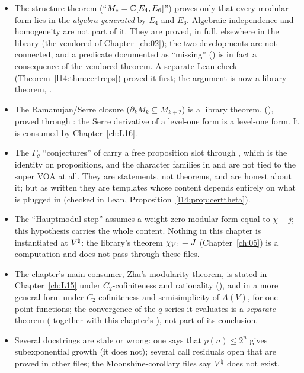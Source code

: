 \begin{itemize}
\item The structure theorem  (``$M_* = {\mathbb{C}}[E_4,E_6]$'') proves only that every modular form lies
  in the \emph{algebra generated} by $E_4$ and $E_6$. Algebraic independence and homogeneity are not part of it. They are
  proved, in full, elsewhere in the library (the vendored  of
  Chapter~\ref{ch:02}); the two developments are not connected, and a predicate documented as ``missing''
  () is in fact a consequence of the vendored theorem. A separate Lean check
  (Theorem~\ref{l14:thm:certreps}) proved it first; the argument is now a library theorem,
  .
\item The Ramanujan/Serre closure  ($\partial_k M_k\subseteq M_{k+2}$) is a library theorem,
   (), proved through
  : the Serre derivative of a level-one form is a level-one form. It is consumed by Chapter~\ref{ch:L16}.
\item The $\Gamma_\theta$ ``conjectures'' of  carry a free proposition slot
   through , which is the identity on propositions, and the character families in
   and  are not tied to the super VOA at all. They are statements, not
  theorems, and are honest about it; but as written they are templates whose content depends entirely on what is plugged in
  (checked in Lean, Proposition~\ref{l14:prop:certtheta}).
\item The ``Hauptmodul step''  assumes a weight-zero modular form equal to $\chi - j$;
  this hypothesis carries the whole content. Nothing in this chapter is instantiated at ${V^{\natural}}$: the library's theorem
  $\chi_{{V^{\natural}}} = J$ (Chapter~\ref{ch:05}) is a computation and does not pass through these files.
\item The chapter's main consumer, Zhu's modularity theorem, is stated in Chapter~\ref{ch:L15} under $C_2$-cofiniteness and
  rationality (), and in a more general form under $C_2$-cofiniteness and semisimplicity of $A(V)$, for
  one-point functions; the convergence of the $q$-series it evaluates is a \emph{separate} theorem
  ( together with this chapter's ), not part of its conclusion.
\item Several docstrings are stale or wrong: one says that $p(n)\le 2^n$ gives subexponential growth (it does not); several
  call residuals open that are proved in other files; the Moonshine-corollary files say ${V^{\natural}}$ does not exist.
\end{itemize}


